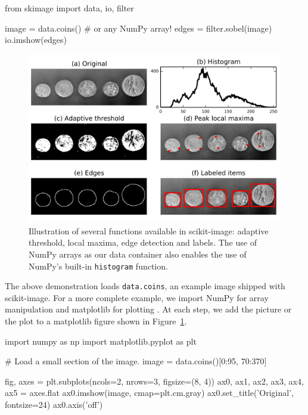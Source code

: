 \documentclass[fleqn,12pt]{wlpeerj}
\begin{document}
\begin{python}
from skimage import data, io, filter

image = data.coins()  # or any NumPy array!
edges = filter.sobel(image)
io.imshow(edges)
\end{python}

\begin{figure}
    \includegraphics[width=\columnwidth]{getting_started_new.png}

    \caption[Getting started figure]{\label{fig:gettingstarted}Illustration of several functions available in scikit-image: adaptive threshold, local maxima, edge detection and labels. The use of NumPy arrays as our data container also enables the use of NumPy's built-in \texttt{histogram} function.}
\end{figure}

The above demonstration loads \texttt{data.coins}, an example image shipped with scikit-image.  For a more complete example, we import NumPy for array manipulation and matplotlib for plotting \citep{numpy,matplotlib}.  At each step, we add the picture or the plot to a matplotlib figure shown in Figure~\ref{fig:gettingstarted}.

\begin{python}
import numpy as np
import matplotlib.pyplot as plt

# Load a small section of the image.
image = data.coins()[0:95, 70:370]

fig, axes = plt.subplots(ncols=2, nrows=3,
figsize=(8, 4))
ax0, ax1, ax2, ax3, ax4, ax5  = axes.flat
ax0.imshow(image, cmap=plt.cm.gray)
ax0.set_title('Original', fontsize=24)
ax0.axis('off')
\end{python}
\end{document}
